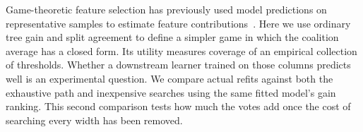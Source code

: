 \documentclass{article}
\begin{document}
Game-theoretic feature selection has previously used model predictions on representative samples to estimate feature contributions~\citep{zhaoStrategicInputs}. Here we use ordinary tree gain and split agreement to define a simpler game in which the coalition average has a closed form. Its utility measures coverage of an empirical collection of thresholds. Whether a downstream learner trained on those columns predicts well is an experimental question. We compare actual refits against both the exhaustive path and inexpensive searches using the same fitted model's gain ranking. This second comparison tests how much the votes add once the cost of searching every width has been removed.






\end{document}
